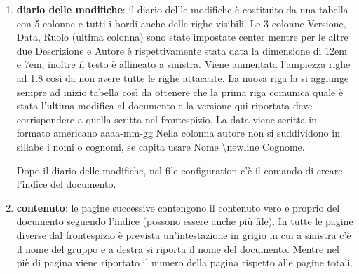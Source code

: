 \begin{enumerate}
    \item \textbf{diario delle modifiche}:
            il diario dellle modifiche è costituito da una tabella con 5 colonne e tutti i 
            bordi anche delle righe visibili. Le 3 colonne Versione, Data, Ruolo (ultima colonna) 
            sono state impostate center mentre per le altre due Descrizione e Autore è 
            rispettivamente stata data la dimensione di 12em e 7em, inoltre il testo è allineato 
            a sinistra. 
            Viene aumentata l'ampiezza righe ad 1.8 così da non avere tutte le righe attaccate. \newline
            La nuova riga la si aggiunge sempre ad inizio tabella così da ottenere che la prima 
            riga comunica quale è stata l'ultima modifica al documento e la versione qui riportata 
            deve corrispondere a quella scritta nel frontespizio. \newline
            La data viene scritta in formato americano aaaa-mm-gg
            Nella colonna autore non si suddividono in sillabe i nomi o cognomi, se capita usare
            Nome \textbackslash newline Cognome.


            Dopo il diario delle modifiche, nel file configuration c'è il comando di creare 
            l'indice del documento.

    \item \textbf{contenuto}: 
            le pagine successive contengono il contenuto vero e proprio del documento seguendo 
            l'indice (possono essere anche più file). In tutte le pagine diverse dal frontespizio è prevista un'intestazione in 
            grigio in cui a sinistra c'è il nome del gruppo e a destra si riporta il nome del documento.
            Mentre nel piè di pagina viene riportato il numero della pagina rispetto alle pagine totali.
\end{enumerate}

